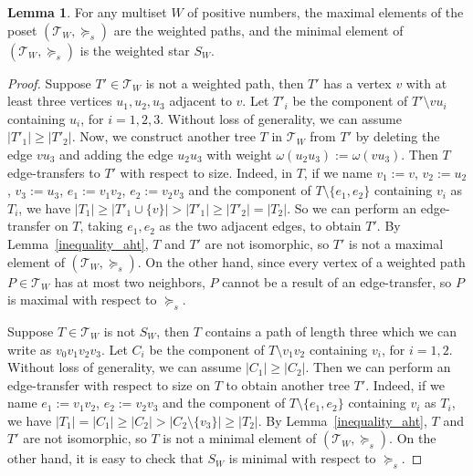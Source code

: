 \documentclass[11pt]{article}
\theoremstyle{definition}
\newtheorem{lemma}[theorem]{Lemma}
\begin{document}
\begin{lemma}\label{poset_aht}
For any multiset $W$ of positive numbers, the maximal elements of the poset $(\mathcal{T}_W,\succeq_s)$ are the weighted paths, and the minimal element of $(\mathcal{T}_W,\succeq_s)$ is the weighted star $S_W$.
\end{lemma}
\begin{proof}
Suppose $T'\in \mathcal{T}_W$ is not a weighted path, then $T'$ has a vertex $v$ with at least three vertices $u_1,u_2,u_3$ adjacent to $v$. Let $T'_i$ be the component of $T'\setminus vu_i$ containing $u_i$, for $i=1,2,3$. Without loss of generality, we can assume $|T'_1|\geq |T'_2|$. Now, we construct another tree $T$ in $\mathcal{T}_W$ from $T'$ by deleting the edge $vu_3$ and adding the edge $u_2u_3$ with weight $\omega(u_2u_3):=\omega(vu_3)$. Then $T$ edge-transfers to $T'$ with respect to size. Indeed, in $T$, if we name $v_1:=v$, $v_2:=u_2$, $v_3:=u_3$, $e_1:=v_1v_2$, $e_{2}:=v_2v_3$ and the component of $T\setminus\{e_1,e_2\}$ containing $v_i$ as $T_i$, we have $|T_1|\geq |T'_1\cup \{v\}|>|T'_1|\geq |T'_2|=|T_2|$. So we can perform an edge-transfer on $T$, taking $e_1,e_2$ as the two adjacent edges, to obtain $T'$. By Lemma~\ref{inequality_aht}, $T$ and $T'$ are not isomorphic, so $T'$ is not a maximal element of $(\mathcal{T}_W,\succeq_s)$. On the other hand, since every vertex of a weighted path $P\in \mathcal{T}_W$ has at most two neighbors, $P$ cannot be a result of an edge-transfer, so $P$ is maximal with respect to $\succeq_s$.

Suppose $T\in \mathcal{T}_W$ is not $S_W$, then $T$ contains a path of length three which we can write as $v_0v_1v_2v_3$. Let $C_i$ be the component of $T\setminus v_1v_2$ containing $v_i$, for $i=1,2$. Without loss of generality, we can assume $|C_1|\geq |C_2|$. Then we can perform an edge-transfer with respect to size on $T$ to obtain another tree $T'$. Indeed, if we name $e_1:=v_1v_2$, $e_{2}:=v_2v_3$ and the component of $T\setminus\{e_1,e_2\}$ containing $v_i$ as $T_i$, we have $|T_1|=|C_1|\geq |C_2|>|C_2\setminus \{v_3\}|\geq |T_2|$. By Lemma~\ref{inequality_aht}, $T$ and $T'$ are not isomorphic, so $T$ is not a minimal element of $(\mathcal{T}_W,\succeq_s)$. On the other hand, it is easy to check that $S_W$ is minimal with respect to $\succeq_s$.
\end{proof}
\end{document}
